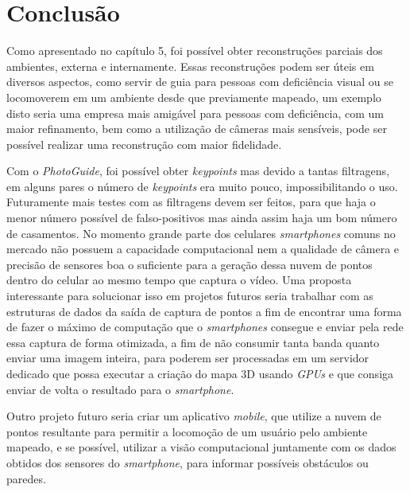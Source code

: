 \chapter{Conclusão}
Como apresentado no capítulo 5, foi possível obter reconstruções parciais dos ambientes, externa e internamente. Essas reconstruções podem ser úteis em diversos aspectos, como servir de guia para pessoas com deficiência visual ou se locomoverem em um ambiente desde que previamente mapeado, um exemplo disto seria uma empresa mais amigável para pessoas com deficiência, com um maior refinamento, bem como a utilização de câmeras mais sensíveis, pode ser possível realizar uma reconstrução com maior fidelidade. 

Com o \textit{PhotoGuide}, foi possível obter \textit{keypoints} mas devido a tantas filtragens, em alguns pares o número de \textit{keypoints} era muito pouco, impossibilitando o uso. Futuramente mais testes com as filtragens devem ser feitos, para que haja o menor número possível de falso-positivos mas ainda assim haja um bom número de casamentos. No momento grande parte dos celulares \textit{smartphones} comuns no mercado não possuem a capacidade computacional nem a qualidade de câmera e precisão de sensores boa o suficiente para a geração dessa nuvem de pontos dentro do celular ao mesmo tempo que captura o vídeo. Uma proposta interessante para solucionar isso em projetos futuros seria trabalhar com as estruturas de dados da saída de captura de pontos a fim de encontrar uma forma de fazer o máximo de computação que o \textit{smartphones} consegue e enviar pela rede essa captura de forma otimizada, a fim de não consumir tanta banda quanto enviar uma imagem inteira, para poderem ser processadas em um servidor dedicado que possa executar a criação do mapa 3D usando \textit{GPUs} e que consiga enviar de volta o resultado para o \textit{smartphone}.
	
Outro projeto futuro seria criar um aplicativo \textit{mobile}, que utilize a nuvem de pontos resultante para permitir a locomoção de um usuário pelo ambiente mapeado, e se possível, utilizar a visão computacional juntamente com os dados obtidos dos sensores do \textit{smartphone}, para informar possíveis obstáculos ou paredes.
